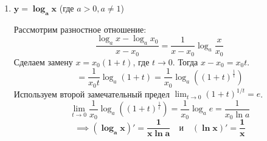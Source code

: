\begin{enumerate}
\begin{enumerate}
		\item \textbf{Целая степень:} $x, x_0 \in \mathbb{R}, \alpha = n \in \mathbb{N}$.
		Используем формулу разности $n$-х степеней $a^n - b^n = (a-b)(a^{n-1} + a^{n-2}b + \dots + b^{n-1})$:
		\[ \frac{x^n - x_0^n}{x - x_0} = x^{n-1} + x^{n-2}x_0 + \dots + x \cdot x_0^{n-2} + x_0^{n-1} \]
		В сумме ровно $n$ слагаемых. При $x \to x_0$ каждое слагаемое стремится к $x_0^{n-1}$.
		\[ \lim_{x\to x_0} (\dots) = n \cdot x_0^{n-1} \]

		\item \textbf{В нуле:} $x_0 = 0, \alpha > 1$.
		По определению:
		\[ f'(0) = \lim_{x\to 0} \frac{x^\alpha - 0^\alpha}{x - 0} = \lim_{x\to 0} x^{\alpha - 1} = 0 \]
		(Предел равен 0, так как степень $\alpha - 1 > 0$).
	\end{enumerate}

	\item $\mathbf{y = \log_a x}$ (где $a > 0, a \neq 1$)
	
	Рассмотрим разностное отношение:
	\[ \frac{\log_a x - \log_a x_0}{x - x_0} = \frac{1}{x - x_0} \log_a \frac{x}{x_0} \]
	Сделаем замену $x = x_0(1+t)$, где $t \to 0$. Тогда $x - x_0 = x_0 t$.
	\[ = \frac{1}{x_0 t} \log_a(1+t) = \frac{1}{x_0} \log_a \left( (1+t)^{\frac{1}{t}} \right) \]
	Используем второй замечательный предел $\lim_{t\to 0} (1+t)^{1/t} = e$.
	\[ \lim_{t\to 0} \frac{1}{x_0} \log_a \left( (1+t)^{\frac{1}{t}} \right) = \frac{1}{x_0} \log_a e = \frac{1}{x_0 \ln a} \]
	\[ \implies \mathbf{(\log_a x)' = \frac{1}{x \ln a}} \quad \text{и} \quad \mathbf{(\ln x)' = \frac{1}{x}} \]
\end{enumerate}
